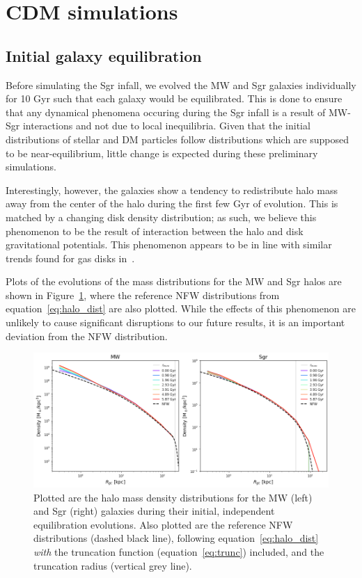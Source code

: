 \section{CDM simulations}
\label{sec:cdm-sim}

\subsection{Initial galaxy equilibration}
Before simulating the Sgr infall, we evolved the MW and Sgr galaxies
individually for 10 Gyr such that each galaxy would be equilibrated. This is
done to ensure that any dynamical phenomena occuring during the Sgr infall is a
result of MW-Sgr interactions and not due to local inequilibria. Given that the
initial distributions of stellar and DM particles follow distributions which are
supposed to be near-equilibrium, little change is expected during these
preliminary simulations.

Interestingly, however, the galaxies show a tendency to redistribute halo mass
away from the center of the halo during the first few Gyr of evolution. This is
matched by a changing disk density distribution; as such, we believe this
phenomenon to be the result of interaction between the halo and disk
gravitational potentials. This phenomenon appears to be in line with similar
trends found for gas disks in~\cite{deg_galactics_2019}.

Plots of the evolutions of the mass distributions for the MW and Sgr halos are
shown in Figure~\ref{fig:cdm_init_halo}, where the reference NFW distributions
from equation~\ref{eq:halo_dist} are also plotted. While the effects of this
phenomenon are unlikely to cause significant disruptions to our future
results, it is an important deviation from the NFW distribution.

\begin{figure}[t]
    \centering
    \includegraphics[width=0.9\linewidth]{fig/cdm/init_halo.png}
    \caption{
        Plotted are the halo mass density distributions for the MW (left) and
        Sgr (right) galaxies during their initial, independent equilibration
        evolutions. Also plotted are the reference NFW distributions (dashed
        black line), following equation~\ref{eq:halo_dist} \textit{with} the
        truncation function (equation~\ref{eq:trunc}) included, and the
        truncation radius (vertical grey line).
    }
    \label{fig:cdm_init_halo}
\end{figure}

